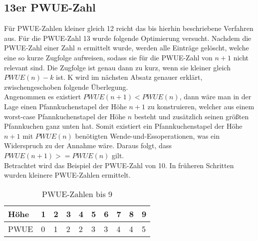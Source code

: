 \subsection{13er PWUE-Zahl}\label{subsec:13er-pwue-zahl}
Für PWUE-Zahlen kleiner gleich 12 reicht das bis hierhin beschriebene Verfahren aus.
Für die PWUE-Zahl 13 wurde folgende Optimierung versucht.
Nachdem die PWUE-Zahl einer Zahl $n$ ermittelt wurde, werden alle Einträge gelöscht, welche eine so kurze Zugfolge
aufweisen, sodass sie für die PWUE-Zahl von $n + 1$ nicht relevant sind.
Die Zugfolge ist genau dann zu kurz, wenn sie kleiner gleich $PWUE(n) - k$ ist.
K wird im nächsten Absatz genauer erklärt, zwischengeschoben folgende Überlegung. \\
Angenommen es existiert $PWUE(n + 1) < PWUE(n)$, dann wäre man in der Lage einen Pfannkuchenstapel der
Höhe $n + 1$ zu konstruieren, welcher aus einem worst-case Pfannkuchenstapel der Höhe $n$ besteht
und zusätzlich seinen grö{\ss}ten Pfannkuchen ganz unten hat.
Somit existiert ein Pfannkuchenstapel der Höhe $n + 1$ mit $PWUE(n)$ benötigten Wende-und-Essoperationen, was ein
Widerspruch zu der Annahme wäre.
Daraus folgt, dass $PWUE(n + 1) >= PWUE(n)$ gilt. \\
Betrachtet wird das Beispiel der PWUE-Zahl von 10.
In früheren Schritten wurden kleinere PWUE-Zahlen ermittelt.
\begin{table}[h]
    \centering
    \begin{tabular}{|l|l|l|l|l|l|l|l|l|l|}
        \hline
        Höhe & 1 & 2 & 3 & 4 & 5 & 6 & 7 & 8 & 9 \\ \hline
        PWUE & 0 & 1 & 2 & 2 & 3 & 3 & 4 & 4 & 5 \\ \hline
    \end{tabular}
    \caption{PWUE-Zahlen bis 9}
    \label{tab:pwue-bis-9}
\end{table}

